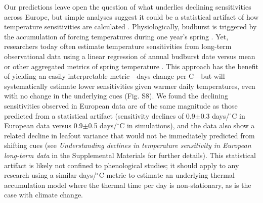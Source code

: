 \documentclass{article}
\begin{document}
\par Our predictions leave open the question of what underlies declining sensitivities across Europe, but simple analyses suggest it could be a statistical artifact of how temperature sensitivities are calculated \citep{vitasse2018,gusewell2017}. Physiologically, budburst is triggered by the accumulation of forcing temperatures during one year's spring \citep{hanninen1995,chuine2016}. Yet, researchers today often estimate temperature sensitivities from long-term observational data using a linear regression of annual budburst date versus mean or other aggregated metrics of spring temperature \citep[e.g.,][]{Wolkovich:2012n}. This approach has the benefit of yielding an easily interpretable metric---days change per \degree C---but will systematically estimate lower sensitivities given warmer daily temperatures, even with no change in the underlying cues (Fig. S8). We found the declining sensitivities observed in European data are of the same magnitude as those predicted from a statistical artifact (sensitivity declines of 0.9$\pm$0.3 days/$^{\circ}$C in European data versus 0.9$\pm$0.5 days/$^{\circ}$C in simulations), and the data also show a related decline in leafout variance that would not be immediately predicted from shifting cues (see \emph{Understanding declines in temperature sensitivity in European long-term data} in the Supplemental Materials for further details). This statistical artifact is likely not confined to phenological studies; it should apply to any research using a similar days/$^{\circ}$C metric to estimate an underlying thermal accumulation model where the thermal time per day is non-stationary, as is the case with climate change. 
\end{document}
